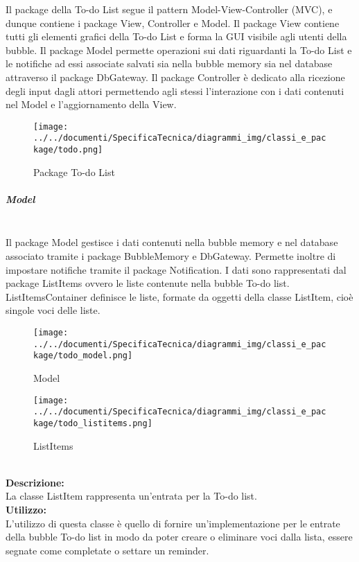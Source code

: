 Il package della To-do List segue il pattern Model-View-Controller (MVC), e dunque contiene i package View, Controller e Model. Il package View contiene tutti gli elementi grafici della To-do List e forma la GUI visibile agli utenti della bubble. Il package Model permette operazioni sui dati riguardanti la To-do List e le notifiche ad essi associate salvati sia nella bubble memory sia nel database attraverso il package Db\-Gateway. Il package Controller è dedicato alla ricezione degli input dagli attori permettendo agli stessi l'interazione con i dati contenuti nel Model e l'aggiornamento della View.

\begin{figure}[H]
	\centering
	\texttt{[image: ../../documenti/SpecificaTecnica/diagrammi\_img/classi\_e\_package/todo.png]}
	\caption{Package To-do List}
\end{figure}

\subparagraph{Model}\mbox{}\\
Il package Model gestisce i dati contenuti nella bubble memory e nel database associato tramite i package BubbleMemory e Db\-Gateway. Permette inoltre di impostare notifiche tramite il package Notification. I dati sono rappresentati dal package List\-Items ovvero le liste contenute nella bubble To-do list. List\-Items\-Container definisce le liste, formate da oggetti della classe List\-Item, cioè singole voci delle liste. 
\begin{figure}[H]
	\centering
	\texttt{[image: ../../documenti/SpecificaTecnica/diagrammi\_img/classi\_e\_package/todo\_model.png]}
	\caption{Model}
\end{figure}

\begin{figure}[H]
	\centering
	\texttt{[image: ../../documenti/SpecificaTecnica/diagrammi\_img/classi\_e\_package/todo\_listitems.png]}
	\caption{List\-Items}
\end{figure}

\label{todo-item}\mbox{}\\
\textbf{Descrizione:}\\ \nopagebreak
La classe List\-Item rappresenta un'entrata per la To-do list.\\
\textbf{Utilizzo:}\\ \nopagebreak
L'utilizzo di questa classe è quello di fornire un'implementazione per le entrate della bubble To-do list in modo da poter creare o eliminare voci dalla lista, essere segnate come completate o settare un reminder.\\

